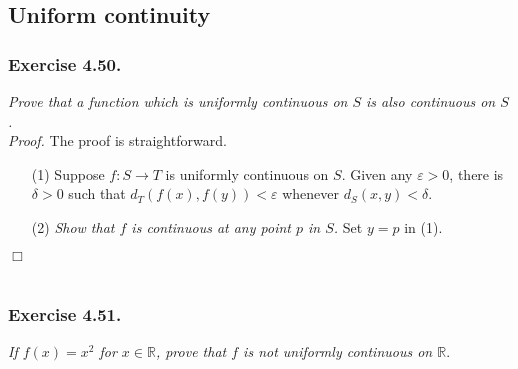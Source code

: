 \documentclass{article}
\begin{document}



\subsection*{Uniform continuity \\}



\subsubsection*{Exercise 4.50.}
\emph{Prove that a function which is uniformly continuous on $S$
is also continuous on $S$.} \\

\emph{Proof.}
The proof is straightforward.
\begin{enumerate}
\item[(1)]
Suppose $f: S \rightarrow T$ is uniformly continuous on $S$.
Given any $\varepsilon > 0$, there is $\delta > 0$ such that
$d_T(f(x), f(y)) < \varepsilon$ whenever $d_S(x, y) < \delta$.
\item[(2)]
\emph{Show that $f$ is continuous at any point $p$ in $S$.}
Set $y = p$ in (1).
\end{enumerate}
$\Box$ \\\\






\subsubsection*{Exercise 4.51.}
\emph{If $f(x) = x^2$ for $x \in \mathbb{R}$,
prove that $f$ is not uniformly continuous on $\mathbb{R}$}. \\
\end{document}
